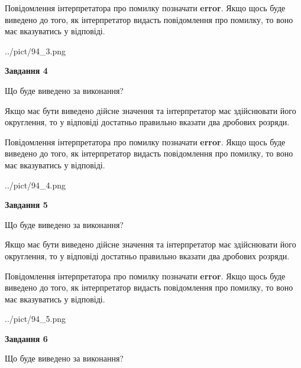 \documentclass[12pt, ukrainian]{article}
\begin{document}
{\begin {Large}
Повідомлення інтерпретатора про помилку позначати \textbf{error}.
Якщо щось буде виведено до того, як інтерпретатор видасть повідомлення про помилку, 
то воно має вказуватись у відповіді. \par

\begin{center}
	{../pict/94_3.png}
\end{center}
\newpage

{\begin {center}\textbf{Завдання 4}\end {center}}\par
Що буде виведено за виконання? \par

Якщо має бути виведено дійсне значення та інтерпретатор має здійснювати його округлення, 
то у відповіді достатньо правильно вказати два дробових розряди.

Повідомлення інтерпретатора про помилку позначати \textbf{error}.
Якщо щось буде виведено до того, як інтерпретатор видасть повідомлення про помилку, 
то воно має вказуватись у відповіді. \par

\begin{center}
	{../pict/94_4.png}
\end{center}
\newpage

{\begin {center}\textbf{Завдання 5}\end {center}}\par
Що буде виведено за виконання? \par

Якщо має бути виведено дійсне значення та інтерпретатор має здійснювати його округлення, 
то у відповіді достатньо правильно вказати два дробових розряди.

Повідомлення інтерпретатора про помилку позначати \textbf{error}.
Якщо щось буде виведено до того, як інтерпретатор видасть повідомлення про помилку, 
то воно має вказуватись у відповіді. \par

\begin{center}
	{../pict/94_5.png}
\end{center}
\newpage

{\begin {center}\textbf{Завдання 6}\end {center}}\par
Що буде виведено за виконання? \par


\end{Large}}
\end{document}
